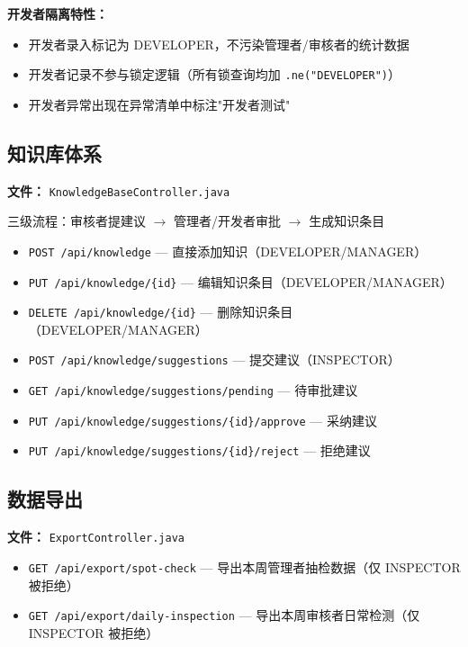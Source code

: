 \documentclass[12pt,a4paper]{ctexart}
\begin{document}
\textbf{开发者隔离特性：}
\begin{itemize}
    \item 开发者录入标记为 DEVELOPER，不污染管理者/审核者的统计数据
    \item 开发者记录不参与锁定逻辑（所有锁查询均加 \texttt{.ne("DEVELOPER")}）
    \item 开发者异常出现在异常清单中标注"开发者测试"
\end{itemize}

\subsection{知识库体系}

\textbf{文件：} \texttt{KnowledgeBaseController.java}

三级流程：审核者提建议 $\rightarrow$ 管理者/开发者审批 $\rightarrow$ 生成知识条目

\begin{itemize}
    \item \texttt{POST /api/knowledge} — 直接添加知识（DEVELOPER/MANAGER）
    \item \texttt{PUT /api/knowledge/\{id\}} — 编辑知识条目（DEVELOPER/MANAGER）
    \item \texttt{DELETE /api/knowledge/\{id\}} — 删除知识条目（DEVELOPER/MANAGER）
    \item \texttt{POST /api/knowledge/suggestions} — 提交建议（INSPECTOR）
    \item \texttt{GET /api/knowledge/suggestions/pending} — 待审批建议
    \item \texttt{PUT /api/knowledge/suggestions/\{id\}/approve} — 采纳建议
    \item \texttt{PUT /api/knowledge/suggestions/\{id\}/reject} — 拒绝建议
\end{itemize}

\subsection{数据导出}

\textbf{文件：} \texttt{ExportController.java}

\begin{itemize}
    \item \texttt{GET /api/export/spot-check} — 导出本周管理者抽检数据（仅 INSPECTOR 被拒绝）
    \item \texttt{GET /api/export/daily-inspection} — 导出本周审核者日常检测（仅 INSPECTOR 被拒绝）
\end{itemize}
\end{document}
